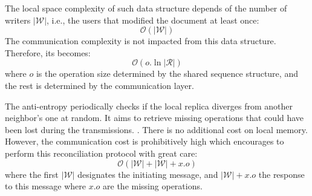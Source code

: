 \begin{asparadesc}
  The local space complexity of such data structure depends of the number of
  writers $|\mathcal{W}|$, i.e., the users that modified the document at least
  once:
  \begin{equation}
    \mathcal{O}(|\mathcal{W}|)
  \end{equation}
  The communication complexity is not impacted from this data structure. Therefore, 
  its becomes:
  \begin{equation}
    \mathcal{O}(o.\ln |\mathcal{R}|)
  \end{equation}
  where $o$ is the operation size determined by the shared sequence structure,
  and the rest is determined by the communication layer.

  The anti-entropy periodically checks if the local replica diverges from
  another neighbor's one at random. It aims to retrieve missing operations that
  could have been lost during the transmissions. . There is no
  additional cost on local memory. However, the communication cost is
  prohibitively high which encourages to perform this reconciliation protocol
  with great care:
  \begin{equation}
    \mathcal{O}(|\mathcal{W}|+|\mathcal{W}|+x.o)
  \end{equation}
  where the first $|\mathcal{W}|$ designates the initiating message, and
  $|\mathcal{W}|+x.o$ the response to this message where $x.o$ are the missing
  operations.

\end{asparadesc}

